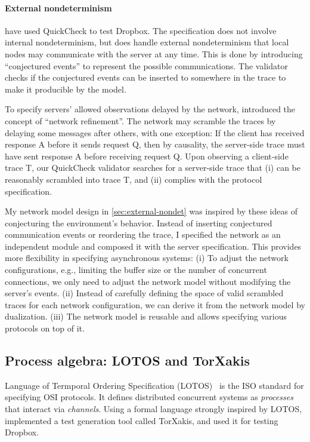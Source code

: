 \paragraph{External nondeterminism}
\citet{testing-dropbox} have used QuickCheck to test Dropbox.  The specification
does not involve internal nondeterminism, but does handle external
nondeterminism that local nodes may communicate with the server at any time.
This is done by introducing ``conjectured events'' to represent the possible
communications.  The validator checks if the conjectured events can be inserted
to somewhere in the trace to make it producible by the model.

To specify servers' allowed observations delayed by the network, \citet{cpp19}
introduced the concept of ``network refinement''.  The network may scramble the
traces by delaying some messages after others, with one exception: If the client
has received response \ilc A before it sends request \ilc Q, then by causality,
the server-side trace must have sent response \ilc A before receiving request
\ilc Q.  Upon observing a client-side trace \ilc T, our QuickCheck validator
searches for a server-side trace that (i) can be reasonably scrambled into trace
\ilc T, and (ii) complies with the protocol specification.

My network model design in \autoref{sec:external-nondet} was inspired by these
ideas of conjecturing the environment's behavior.  Instead of inserting
conjectured communication events or reordering the trace, I specified the
network as an independent module and composed it with the server specification.
This provides more flexibility in specifying asynchronous systems: (i) To adjust
the network configurations, e.g., limiting the buffer size or the number of
concurrent connections, we only need to adjust the network model without
modifying the server's events.  (ii) Instead of carefully defining the space of
valid scrambled traces for each network configuration, we can derive it from the
network model by dualization.  (iii) The network model is reusable and allows
specifying various protocols on top of it.

\subsection{Process algebra: LOTOS and TorXakis}
Language of Termporal Ordering Specification (LOTOS)~\cite{lotos} is the ISO
standard for specifying OSI protocols.  It defines distributed concurrent
systems as {\em processes} that interact via {\em channels}.  Using a formal
language strongly inspired by LOTOS, \citet{torxakis-dropbox} implemented a test
generation tool called TorXakis, and used it for testing Dropbox.

